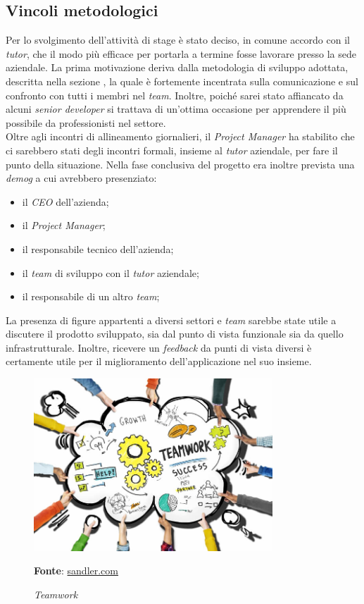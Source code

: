     \subsection{Vincoli metodologici}
        Per lo svolgimento dell'attività di stage è stato deciso, in comune accordo con il \textit{tutor}, che il modo più efficace per portarla a termine fosse lavorare presso la sede aziendale. La prima motivazione deriva dalla metodologia di sviluppo adottata, descritta nella sezione , la quale è fortemente incentrata sulla comunicazione e sul confronto con tutti i membri nel \textit{team}. Inoltre, poiché sarei stato affiancato da alcuni \textit{senior developer} si trattava di un'ottima occasione per apprendere il più possibile da professionisti nel settore. \\
        Oltre agli incontri di allineamento giornalieri, il \textit{Project Manager} ha stabilito che ci sarebbero stati degli incontri formali, insieme al \textit{tutor} aziendale, per fare il punto della situazione. Nella fase conclusiva del progetto era inoltre prevista una \textit{\gls{demog}} a cui avrebbero presenziato:
        \begin{itemize}
            \item il \textit{CEO} dell'azienda;
            \item il \textit{Project Manager};
            \item il responsabile tecnico dell'azienda;
            \item il \textit{team} di sviluppo con il \textit{tutor} aziendale;
            \item il responsabile di un altro \textit{team};
        \end{itemize}
        La presenza di figure appartenti a diversi settori e \textit{team} sarebbe state utile a discutere il prodotto sviluppato, sia dal punto di vista funzionale sia da quello infrastrutturale. Inoltre, ricevere un \textit{feedback} da punti di vista diversi è certamente utile per il miglioramento dell'applicazione nel suo insieme.
        
        \begin{figure}[h]
            \centering
            \includegraphics[width=0.8\textwidth]{immagini/team.jpg}
            \caption{\textit{Teamwork}}
            \textbf{Fonte}:
            \href{https://www.sandler.com/blog/6-benefits-of-teamwork-in-the-workplace/}{sandler.com}
            \label{fig: Teamwork}
        \end{figure}
        
